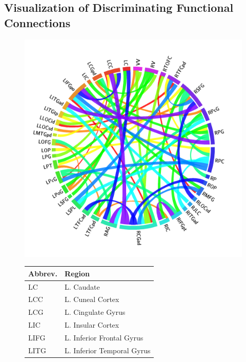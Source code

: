 \documentclass{llncs}
\begin{document}
\subsection{Visualization of Discriminating Functional Connections}

\begin{figure}[htb]
\begin{minipage}[b]{.6\linewidth}
\centering
	\includegraphics[scale = .11]{now_circos3.png}
	\par\vspace{0pt}
\end{minipage}
\begin{minipage}[b]{.4\linewidth}
\centering
\tiny
\begin{tabular}{l l}
\hline
Abbrev. & Region\\
\hline
LC	& L. Caudate\\
LCC	& L. Cuneal Cortex\\
LCG	& L. Cingulate Gyrus\\
LIC	& L. Insular Cortex\\
LIFG	& L. Inferior Frontal Gyrus\\
LITG	& L. Inferior Temporal Gyrus\\

\end{tabular}
\end{minipage}
\end{figure}
\end{document}
